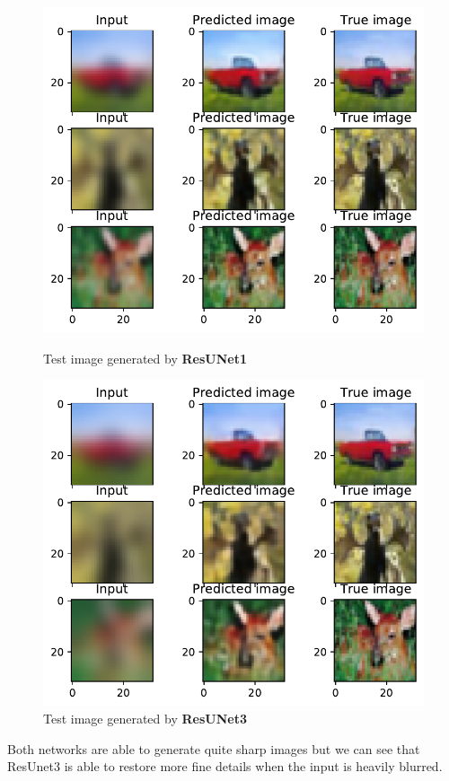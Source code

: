 \begin{figure}[H]
    \centering
    {\includegraphics[height=0.35\textheight]{subsections/resunet/resunet1test.pdf}
    \caption{Test image generated by \textbf{ResUNet1}}}
    {\centering
    \includegraphics[height=0.35\textheight]{subsections/resunet/resunet3test.pdf}
    \caption{Test image generated by \textbf{ResUNet3}}}
\end{figure}

Both networks are able to generate quite sharp images but we can see that ResUnet3 is able to restore more fine details when the input is heavily blurred. 